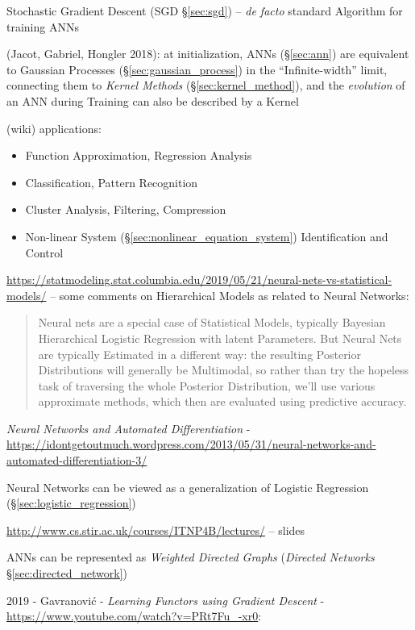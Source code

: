 Stochastic Gradient Descent (SGD \S\ref{sec:sgd}) -- \emph{de facto} standard
Algorithm for training ANNs

(Jacot, Gabriel, Hongler 2018): at initialization, ANNs (\S\ref{sec:ann}) are
equivalent to Gaussian Processes (\S\ref{sec:gaussian_process}) in the
``Infinite-width'' limit, connecting them to \emph{Kernel Methods}
(\S\ref{sec:kernel_method}), and the \emph{evolution} of an ANN during Training
can also be described by a Kernel

(wiki) applications:
\begin{itemize}
  \item Function Approximation, Regression Analysis
  \item Classification, Pattern Recognition
  \item Cluster Analysis, Filtering, Compression
  \item Non-linear System (\S\ref{sec:nonlinear_equation_system})
    Identification and Control
\end{itemize}

\url{https://statmodeling.stat.columbia.edu/2019/05/21/neural-nets-vs-statistical-models/}
-- some comments on Hierarchical Models as related to Neural Networks:
\begin{quote}
  Neural nets are a special case of Statistical Models, typically Bayesian
  Hierarchical Logistic Regression with latent Parameters. But Neural Nets are
  typically Estimated in a different way: the resulting Posterior Distributions
  will generally be Multimodal, so rather than try the hopeless task of
  traversing the whole Posterior Distribution, we’ll use various approximate
  methods, which then are evaluated using predictive accuracy.
\end{quote}

\emph{Neural Networks and Automated Differentiation} -
\url{https://idontgetoutmuch.wordpress.com/2013/05/31/neural-networks-and-automated-differentiation-3/}

Neural Networks can be viewed as a generalization of Logistic Regression
(\S\ref{sec:logistic_regression})

\asterism

\url{http://www.cs.stir.ac.uk/courses/ITNP4B/lectures/} -- slides

ANNs can be represented as \emph{Weighted Directed Graphs}
(\emph{Directed Networks} \S\ref{sec:directed_network})

\asterism

2019 - Gavranovi\'c - \emph{Learning Functors using Gradient Descent} -
\url{https://www.youtube.com/watch?v=PRt7Fu_-xr0}:

